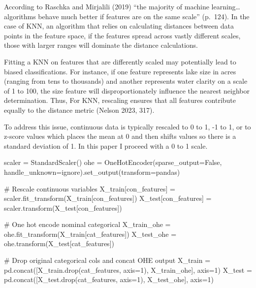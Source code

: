 \documentclass[
]{article}
\newenvironment{Shaded}{\begin{snugshade}}{\end{snugshade}}
\newcommand{\CommentTok}[1]{\textcolor[rgb]{0.37,0.37,0.37}{#1}}
\newcommand{\DecValTok}[1]{\textcolor[rgb]{0.68,0.00,0.00}{#1}}
\newcommand{\NormalTok}[1]{\textcolor[rgb]{0.00,0.23,0.31}{#1}}
\newcommand{\OperatorTok}[1]{\textcolor[rgb]{0.37,0.37,0.37}{#1}}
\newcommand{\StringTok}[1]{\textcolor[rgb]{0.13,0.47,0.30}{#1}}
\newcommand{\VariableTok}[1]{\textcolor[rgb]{0.07,0.07,0.07}{#1}}
\begin{document}
According to Raschka and Mirjalili (2019) ``the majority of machine
learning\ldots{} algorithms behave much better if features are on the
same scale'' (p.~124). In the case of KNN, an algorithm that relies on
calculating distances between data points in the feature space, if the
features spread across vastly different scales, those with larger ranges
will dominate the distance calculations.

Fitting a KNN on features that are differently scaled may potentially
lead to biased classifications. For instance, if one feature represents
lake size in acres (ranging from tens to thousands) and another
represents water clarity on a scale of 1 to 100, the size feature will
disproportionately influence the nearest neighbor determination. Thus,
For KNN, rescaling ensures that all features contribute equally to the
distance metric (Nelson 2023, 317).

To address this issue, continuous data is typically rescaled to 0 to 1,
-1 to 1, or to z-score values which places the mean at 0 and then shifts
values so there is a standard deviation of 1. In this paper I proceed
with a 0 to 1 scale.

\begin{Shaded}
\begin{Highlighting}[]
\NormalTok{scaler }\OperatorTok{=}\NormalTok{ StandardScaler()}
\NormalTok{ohe }\OperatorTok{=}\NormalTok{ OneHotEncoder(sparse\_output}\OperatorTok{=}\VariableTok{False}\NormalTok{, }
\NormalTok{                    handle\_unknown}\OperatorTok{=}\StringTok{\textquotesingle{}ignore\textquotesingle{}}\NormalTok{).set\_output(transform}\OperatorTok{=}\StringTok{\textquotesingle{}pandas\textquotesingle{}}\NormalTok{)}

\CommentTok{\# Rescale continuous variables}
\NormalTok{X\_train[con\_features] }\OperatorTok{=}\NormalTok{ scaler.fit\_transform(X\_train[con\_features])}
\NormalTok{X\_test[con\_features] }\OperatorTok{=}\NormalTok{ scaler.transform(X\_test[con\_features])}

\CommentTok{\# One hot encode nominal categorical}
\NormalTok{X\_train\_ohe }\OperatorTok{=}\NormalTok{ ohe.fit\_transform(X\_train[cat\_features])}
\NormalTok{X\_test\_ohe }\OperatorTok{=}\NormalTok{ ohe.transform(X\_test[cat\_features])}

\CommentTok{\# Drop original categorical cols and concat OHE output}
\NormalTok{X\_train }\OperatorTok{=}\NormalTok{ pd.concat([X\_train.drop(cat\_features, axis}\OperatorTok{=}\DecValTok{1}\NormalTok{), X\_train\_ohe], axis}\OperatorTok{=}\DecValTok{1}\NormalTok{)}
\NormalTok{X\_test }\OperatorTok{=}\NormalTok{ pd.concat([X\_test.drop(cat\_features, axis}\OperatorTok{=}\DecValTok{1}\NormalTok{), X\_test\_ohe], axis}\OperatorTok{=}\DecValTok{1}\NormalTok{)}
\end{Highlighting}
\end{Shaded}
\end{document}
